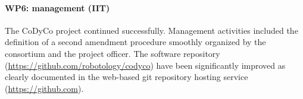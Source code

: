 

\paragraph*{WP6: management (IIT)}

The CoDyCo project continued successfully. Management activities included the definition of a second amendment procedure smoothly organized by the consortium and the project officer. The software repository (\url{https://github.com/robotology/codyco}) have been significantly improved as clearly documented in the web-based git repository hosting service (\url{https://github.com}). 
